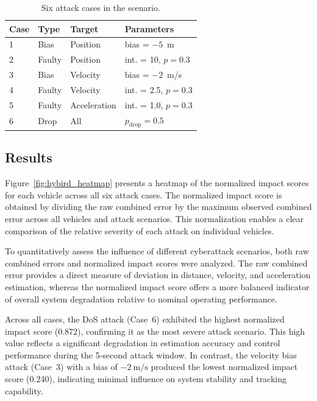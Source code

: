 \begin{table}[h!]
\centering
\caption{Six attack cases in the scenario.}
\label{tab:attack_mix}
\begin{tabular}{llll}
\toprule
\textbf{Case} & \textbf{Type} & \textbf{Target} & \textbf{Parameters} \\
\midrule
1 & Bias & Position & bias = $-5$~m \\
2 & Faulty & Position & int. = 10, $p = 0.3$ \\
3 & Bias & Velocity & bias = $-2$~m/s \\
4 & Faulty & Velocity & int. = 2.5, $p = 0.3$ \\
5 & Faulty & Acceleration & int. = 1.0, $p = 0.3$ \\
6 & Drop & All & $p_\text{drop} = 0.5$ \\
\bottomrule
\end{tabular}
\end{table}

\vspace*{-0.2cm}
\subsection {Results}
\vspace*{-0.2cm}

Figure~\ref{fig:hybird_heatmap} presents a heatmap of the normalized impact scores for each vehicle across all six attack cases. The normalized impact score is obtained by dividing the raw combined error by the maximum observed combined error across all vehicles and attack scenarios. This normalization enables a clear comparison of the relative severity of each attack on individual vehicles.

To quantitatively assess the influence of different cyberattack scenarios, both raw combined errors and normalized impact scores were analyzed. The raw combined error provides a direct measure of deviation in distance, velocity, and acceleration estimation, whereas the normalized impact score offers a more balanced indicator of overall system degradation relative to nominal operating performance.

Across all cases, the DoS attack (Case~6) exhibited the highest normalized impact score (0.872), confirming it as the most severe attack scenario. This high value reflects a significant degradation in estimation accuracy and control performance during the 5-second attack window. In contrast, the velocity bias attack (Case~3) with a bias of $-2~\text{m/s}$ produced the lowest normalized impact score (0.240), indicating minimal influence on system stability and tracking capability.

